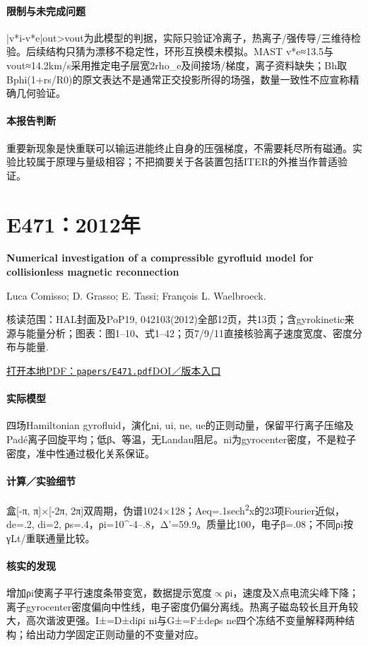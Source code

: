 \paragraph{限制与未完成问题}|v*i-v*e|out>vout为此模型的判据，实际只验证冷离子，热离子/强传导/三维待检验。后续结构只猜为漂移不稳定性，环形互换模未模拟。MAST v*e≈13.5与vout≈14.2km/s采用推定电子层宽2rho\_e及间接场/梯度，离子资料缺失；Bh取Bphi(1+rs/R0)的原文表达不是通常正交投影所得的场强，数量一致性不应宣称精确几何验证。

\paragraph{本报告判断}重要新现象是快重联可以输运进能终止自身的压强梯度，不需要耗尽所有磁通。实验比较属于原理与量级相容；不把摘要关于各装置包括ITER的外推当作普适验证。

\section{E471：2012年}\label{paper:E471}

\textbf{Numerical investigation of a compressible gyrofluid model for collisionless magnetic reconnection}\citep{E471}\

Luca Comisso;  D. Grasso;  E. Tassi;  François L. Waelbroeck.

\textsf{核读范围：}HAL封面及PoP19, 042103(2012)全部12页，共13页；含gyrokinetic来源与能量分析；\textsf{图表：}图1–10、式1–42；页7/9/11直接核验离子速度宽度、密度分布与能量.

\href{run:papers/E471.pdf}{打开本地PDF：\texttt{papers/E471.pdf}}\quad\href{https://doi.org/10.1063/1.3697860}{DOI／版本入口}

\paragraph{实际模型}四场Hamiltonian gyrofluid，演化ni, ui, ne, ue的正则动量，保留平行离子压缩及Padé离子回旋平均；低β、等温，无Landau阻尼。ni为gyrocenter密度，不是粒子密度，准中性通过极化关系保证。

\paragraph{计算／实验细节}盒[-π, π]×[-2π, 2π]双周期，伪谱1024×128；Aeq=.1sech\textsuperscript{2}x的23项Fourier近似，de=.2, di=2, ρs=.4，ρi=10\textasciicircum{}-4–.8，Δ'=59.9。质量比100，电子β=.08；不同ρi按γLt/重联通量比较。

\paragraph{核实的发现}增加ρi使离子平行速度条带变宽，数据提示宽度\ensuremath{\propto}ρi，速度及X点电流尖峰下降；离子gyrocenter密度偏向中性线，电子密度仍偏分离线。热离子磁岛较长且开角较大，高次谐波更强。I±=D±diρi ni与G±=F±deρs ne四个冻结不变量解释两种结构；给出动力学固定正则动量的不变量对应。

